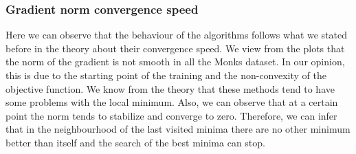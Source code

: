 \subsubsection{Gradient norm convergence speed}
Here we can observe that the behaviour of the algorithms follows what we stated before in the theory about their convergence speed. We view from the plots that the norm of the gradient is not smooth in all the Monks dataset. In our opinion, this is due to the starting point of the training and the non-convexity of the objective function. We know from the theory that these methods tend to have some problems with the local minimum. Also, we can observe that at a certain point the norm tends to stabilize and converge to zero. Therefore, we can infer that in the neighbourhood of the last visited minima there are no other minimum better than itself and the search of the best minima can stop.
